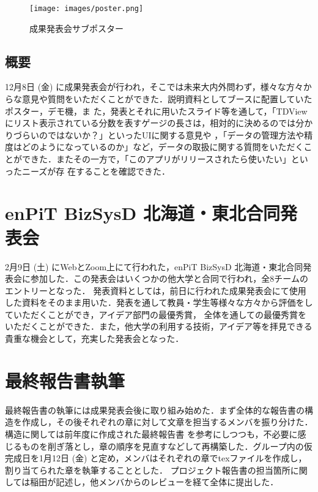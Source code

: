\begin{figure}[H]
    \centering
    \texttt{[image: images/poster.png]}
    \caption{成果発表会サブポスター}
    \label{fig:poster}
\end{figure}


\subsection{概要}
12月8日 (金) に成果発表会が行われ，そこでは未来大内外問わず，様々な方々からな意見や質問をいただくことができた．説明資料としてブースに配置していたポスター，デモ機，ま
た，発表とそれに用いたスライド等を通して，「TDViewにリスト表示されている分数を表すゲージの長さは，相対的に決めるのでは分かりづらいのではないか？」といったUIに関する意見や
，「データの管理方法や精度はどのようになっているのか」など，データの取扱に関する質問をいただくことができた．またその一方で，「このアプリがリリースされたら使いたい」といったニーズが存
在することを確認できた．

\section{enPiT BizSysD 北海道・東北合同発表会}
2月9日 (土) にWebとZoom上にて行われた，enPiT BizSysD 北海道・東北合同発表会に参加した．この発表会はいくつかの他大学と合同で行われ，全8チームのエントリーとなった．
発表資料としては，前日に行われた成果発表会にて使用した資料をそのまま用いた．発表を通して教員・学生等様々な方々から評価をしていただくことができ，アイデア部門の最優秀賞，
全体を通しての最優秀賞をいただくことができた．また，他大学の利用する技術，アイデア等を拝見できる貴重な機会として，充実した発表会となった．

\section{最終報告書執筆}
最終報告書の執筆には成果発表会後に取り組み始めた．まず全体的な報告書の構造を作成し，その後それぞれの章に対して文章を担当するメンバを振り分けた．構造に関しては前年度に作成された最終報告書
を参考にしつつも，不必要に感じるものを削ぎ落とし，章の順序を見直すなどして再構築した．グループ内の仮完成日を1月12日 (金) と定め，メンバはそれぞれの章でtexファイルを作成し，割り当てられた章を執筆することとした．
プロジェクト報告書の担当箇所に関しては稲田が記述し，他メンバからのレビューを経て全体に提出した．
